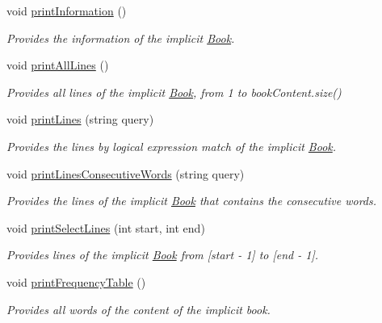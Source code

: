 \begin{DoxyCompactItemize}
void \hyperlink{class_book_a5b67f59017da9d2654c27fa27927a419}{print\+Information} ()
\begin{DoxyCompactList}\small\item\em Provides the information of the implicit \hyperlink{class_book}{Book}. \end{DoxyCompactList}\item 
void \hyperlink{class_book_a07076ae8fe5e924f18bf7527e0ba5092}{print\+All\+Lines} ()
\begin{DoxyCompactList}\small\item\em Provides all lines of the implicit \hyperlink{class_book}{Book}, from 1 to book\+Content.\+size() \end{DoxyCompactList}\item 
void \hyperlink{class_book_a0c019a8318999229bf506f7f64e67a85}{print\+Lines} (string query)
\begin{DoxyCompactList}\small\item\em Provides the lines by logical expression match of the implicit \hyperlink{class_book}{Book}. \end{DoxyCompactList}\item 
void \hyperlink{class_book_ad72be3b32007023b6bb41f12276e81a3}{print\+Lines\+Consecutive\+Words} (string query)
\begin{DoxyCompactList}\small\item\em Provides the lines of the implicit \hyperlink{class_book}{Book} that contains the consecutive words. \end{DoxyCompactList}\item 
void \hyperlink{class_book_a7193030998d6251851be26196762f8e6}{print\+Select\+Lines} (int start, int end)
\begin{DoxyCompactList}\small\item\em Provides lines of the implicit \hyperlink{class_book}{Book} from \mbox{[}start -\/ 1\mbox{]} to \mbox{[}end -\/ 1\mbox{]}. \end{DoxyCompactList}\item 
void \hyperlink{class_book_ac8b57c6a725ae9afeb24e6e74d4f8fd0}{print\+Frequency\+Table} ()
\begin{DoxyCompactList}\small\item\em Provides all words of the content of the implicit book. \end{DoxyCompactList}\end{DoxyCompactItemize}
